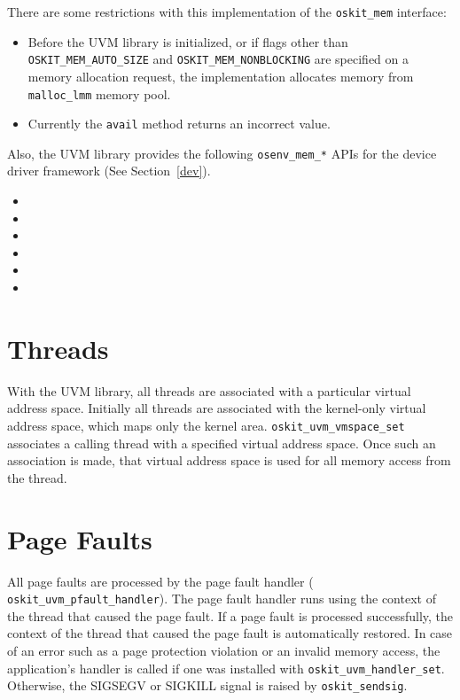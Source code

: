There are some restrictions with this implementation of the \texttt{oskit_mem}
interface:

\begin{itemize}

\item Before the UVM library is initialized, or if flags other than
\texttt{OSKIT_MEM_AUTO_SIZE} and \texttt{OSKIT_MEM_NONBLOCKING} are
specified on a memory allocation request, the implementation allocates
memory from \texttt{malloc_lmm} memory pool.

\item Currently the \texttt{avail} method returns an incorrect value.
\end{itemize}

Also, the UVM library provides the following \texttt{osenv_mem_*} APIs
for the \oskit{} device driver framework (See Section~\ref{dev}).

\begin{itemize}
\item {}
\item {}
\item {}
\item {}
\item {}
\item {}
\end{itemize}

\section{Threads}
With the UVM library, all threads are associated with a particular
virtual address space.  Initially all threads are associated with the
kernel-only virtual address space, which maps only the kernel area.
{\tt oskit_uvm_vmspace_set} associates a calling thread with a
specified virtual address space.  Once such an association is made,
that virtual address space is used for all memory access from
the thread.

\section{Page Faults}
\label{uvm-page-faults}
All page faults are processed by the page fault handler ({\tt
oskit_uvm_pfault_handler}).  The page fault handler runs using the
context of the thread that caused the page fault.  If a page fault is
processed successfully, the context of the thread that caused the page
fault is automatically restored.  In case of an error such as
a page protection violation or an invalid memory access,
the application's handler is called if one was installed with
{\tt oskit_uvm_handler_set}.  Otherwise, the SIGSEGV or SIGKILL
signal is raised by {\tt oskit_sendsig}.

